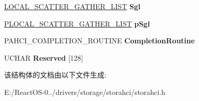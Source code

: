 \begin{DoxyCompactItemize}
\hyperlink{struct___l_o_c_a_l___s_c_a_t_t_e_r___g_a_t_h_e_r___l_i_s_t}{L\+O\+C\+A\+L\+\_\+\+S\+C\+A\+T\+T\+E\+R\+\_\+\+G\+A\+T\+H\+E\+R\+\_\+\+L\+I\+ST} {\bfseries Sgl}
\item 
\mbox{\label{struct___a_h_c_i___s_r_b___e_x_t_e_n_s_i_o_n_ac183f52dac20a92e2bacc20ece73411e}} 
\hyperlink{struct___l_o_c_a_l___s_c_a_t_t_e_r___g_a_t_h_e_r___l_i_s_t}{P\+L\+O\+C\+A\+L\+\_\+\+S\+C\+A\+T\+T\+E\+R\+\_\+\+G\+A\+T\+H\+E\+R\+\_\+\+L\+I\+ST} {\bfseries p\+Sgl}
\item 
\mbox{\label{struct___a_h_c_i___s_r_b___e_x_t_e_n_s_i_o_n_a2b65ecb56f3a57b491a2db04cd24a211}} 
P\+A\+H\+C\+I\+\_\+\+C\+O\+M\+P\+L\+E\+T\+I\+O\+N\+\_\+\+R\+O\+U\+T\+I\+NE {\bfseries Completion\+Routine}
\item 
\mbox{\label{struct___a_h_c_i___s_r_b___e_x_t_e_n_s_i_o_n_acaae4f8be99163053416952502f32f70}} 
U\+C\+H\+AR {\bfseries Reserved} \mbox{[}128\mbox{]}
\end{DoxyCompactItemize}


该结构体的文档由以下文件生成\+:\begin{DoxyCompactItemize}
\item 
E\+:/\+React\+O\+S-\/0../drivers/storage/storahci/storahci.\+h\end{DoxyCompactItemize}
